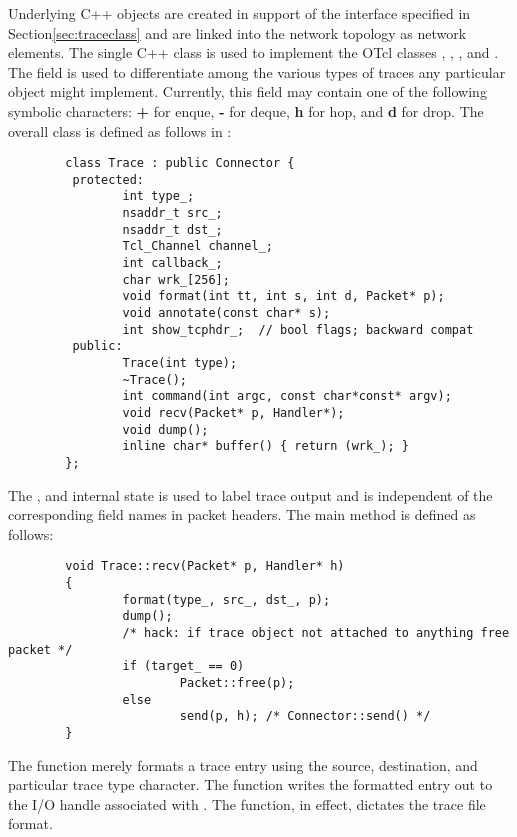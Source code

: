 Underlying C++ objects are created in support of the interface specified
in Section\ref{sec:traceclass} and are linked into the network topology
as network elements.
The single C++  class is used to implement the OTcl
classes , , ,
and .
The  field is used to differentiate among the
various types of
traces any particular  object might implement.
Currently, this field may contain one of the following symbolic characters:
{\bf +} for enque, {\bf -} for deque, {\bf h} for hop, and
{\bf d} for drop.
The overall class is defined as follows in :
\begin{small}
\begin{verbatim}
        class Trace : public Connector {
         protected:
                int type_;
                nsaddr_t src_;
                nsaddr_t dst_;
                Tcl_Channel channel_;
                int callback_;
                char wrk_[256];
                void format(int tt, int s, int d, Packet* p);
                void annotate(const char* s);
                int show_tcphdr_;  // bool flags; backward compat
         public:
                Trace(int type);
                ~Trace();
                int command(int argc, const char*const* argv);
                void recv(Packet* p, Handler*);
                void dump();
                inline char* buffer() { return (wrk_); }
        };
\end{verbatim}
\end{small}

The , and  internal state is used
to label trace output and is independent of the corresponding field
names in packet headers.
The main  method is defined as follows:
\begin{small}
\begin{verbatim}
        void Trace::recv(Packet* p, Handler* h)
        {
                format(type_, src_, dst_, p);
                dump();
                /* hack: if trace object not attached to anything free packet */
                if (target_ == 0)
                        Packet::free(p);
                else
                        send(p, h); /* Connector::send() */
        }
\end{verbatim}
\end{small}
The function merely formats a trace entry using the source, destination,
and particular trace type character.
The  function writes the formatted entry out to the
I/O handle associated with .
The  function, in effect, dictates the trace file format.

